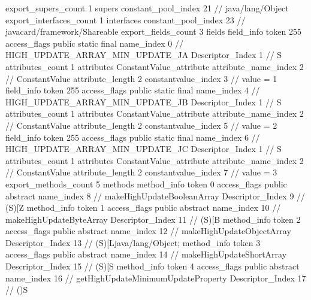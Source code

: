 {{{			export_supers_count	1
			supers {
				constant_pool_index	21		// java/lang/Object
			}
			export_interfaces_count	1
			interfaces {
				constant_pool_index	23		// javacard/framework/Shareable
			}
			export_fields_count	3
			fields {
			field_info {
				token	255
				access_flags	public static final
				name_index	0		// HIGH_UPDATE_ARRAY_MIN_UPDATE_JA
				Descriptor_Index	1		// S
				attributes_count	1
				attributes {
				ConstantValue_attribute {
					attribute_name_index	2		// ConstantValue
					attribute_length	2
					constantvalue_index	3		// value = 1
				}
				}
			}
			field_info {
				token	255
				access_flags	public static final
				name_index	4		// HIGH_UPDATE_ARRAY_MIN_UPDATE_JB
				Descriptor_Index	1		// S
				attributes_count	1
				attributes {
				ConstantValue_attribute {
					attribute_name_index	2		// ConstantValue
					attribute_length	2
					constantvalue_index	5		// value = 2
				}
				}
			}
			field_info {
				token	255
				access_flags	public static final
				name_index	6		// HIGH_UPDATE_ARRAY_MIN_UPDATE_JC
				Descriptor_Index	1		// S
				attributes_count	1
				attributes {
				ConstantValue_attribute {
					attribute_name_index	2		// ConstantValue
					attribute_length	2
					constantvalue_index	7		// value = 3
				}
				}
			}
			}
			export_methods_count	5
			methods {
				method_info {
					token	0
					access_flags	public abstract
					name_index	8		// makeHighUpdateBooleanArray
					Descriptor_Index	9		// (S)[Z
				}
				method_info {
					token	1
					access_flags	public abstract
					name_index	10		// makeHighUpdateByteArray
					Descriptor_Index	11		// (S)[B
				}
				method_info {
					token	2
					access_flags	public abstract
					name_index	12		// makeHighUpdateObjectArray
					Descriptor_Index	13		// (S)[Ljava/lang/Object;
				}
				method_info {
					token	3
					access_flags	public abstract
					name_index	14		// makeHighUpdateShortArray
					Descriptor_Index	15		// (S)[S
				}
				method_info {
					token	4
					access_flags	public abstract
					name_index	16		// getHighUpdateMinimumUpdateProperty
					Descriptor_Index	17		// ()S
				}
			}
		}
	}
}
